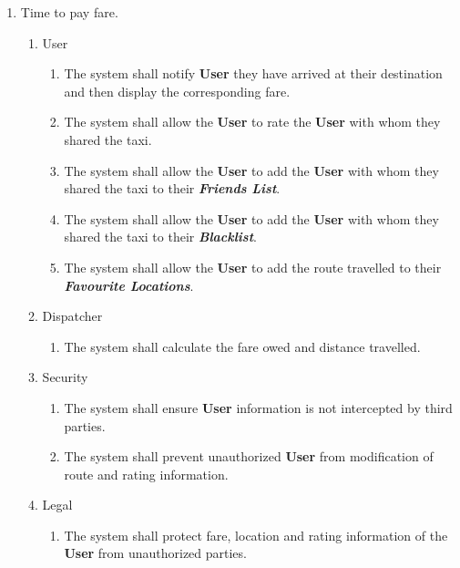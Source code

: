 \documentclass[english]{article}
\begin{document}
\begin{enumerate}[{BE}1.]
	\item Time to pay fare. 
	\begin{enumerate}[{VP6}.1]
		\item User
			\begin{enumerate}
				\item The system shall notify \textbf{User} they have arrived at their destination and then display the corresponding fare.
				\item The system shall allow the \textbf{User} to rate the \textbf{User} with whom they shared the taxi.
				\item The system shall allow the \textbf{User} to add the \textbf{User} with whom they shared the taxi to their \textbf{\emph{Friends List}}.
				\item The system shall allow the \textbf{User} to add the \textbf{User} with whom they shared the taxi to their \textbf{\emph{Blacklist}}.
				\item The system shall allow the \textbf{User} to add the route travelled to their \textbf{\emph{Favourite Locations}}.
			\end{enumerate}
		\item Dispatcher
			\begin{enumerate}
				\item The system shall calculate the fare owed and distance travelled. 
			\end{enumerate}
		\item Security
			\begin{enumerate}
				\item The system shall ensure \textbf{User} information is not intercepted by third parties.
				\item The system shall prevent unauthorized \textbf{User} from modification of route and rating information. 
			\end{enumerate}
		\item Legal
			\begin{enumerate}
				\item The system shall protect fare, location and rating information of the \textbf{User} from unauthorized parties.
			\end{enumerate}
	\end{enumerate}
	

\end{enumerate}
\end{document}
